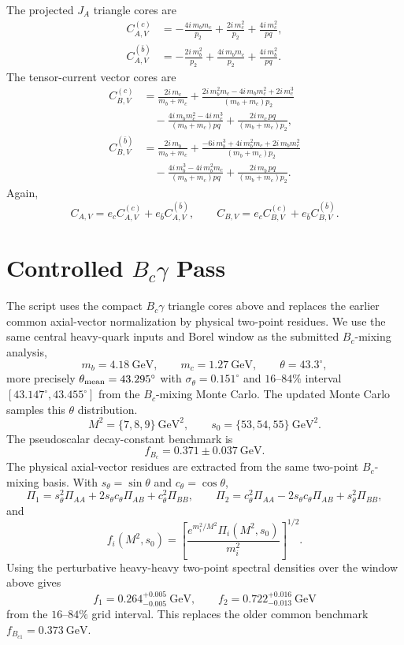 \documentclass[11pt]{article}
\newcommand{\Bc}{B_c}
\newcommand{\BcOne}{B_{c1}}
\newcommand{\GeV}{\mathrm{GeV}}
\begin{document}
The projected \(J_A\) triangle cores are
\[
\begin{aligned}
C_{A,V}^{(c)} &=
-\frac{4i\,m_bm_c}{p_2}
+\frac{2i\,m_c^2}{p_2}
+\frac{4i\,m_c^2}{pq},\\
C_{A,V}^{(\bar b)} &=
-\frac{2i\,m_b^2}{p_2}
+\frac{4i\,m_bm_c}{p_2}
+\frac{4i\,m_b^2}{pq}.
\end{aligned}
\]
The tensor-current vector cores are
\[
\begin{aligned}
C_{B,V}^{(c)} &=
\frac{2i\,m_c}{m_b+m_c}
+\frac{2i\,m_b^2m_c-4i\,m_bm_c^2+2i\,m_c^3}
       {(m_b+m_c)p_2} \\
&\quad
-\frac{4i\,m_bm_c^2-4i\,m_c^3}{(m_b+m_c)pq}
+\frac{2i\,m_c\,pq}{(m_b+m_c)p_2},\\
C_{B,V}^{(\bar b)} &=
\frac{2i\,m_b}{m_b+m_c}
+\frac{-6i\,m_b^3+4i\,m_b^2m_c+2i\,m_bm_c^2}
       {(m_b+m_c)p_2} \\
&\quad
-\frac{4i\,m_b^3-4i\,m_b^2m_c}{(m_b+m_c)pq}
+\frac{2i\,m_b\,pq}{(m_b+m_c)p_2}.
\end{aligned}
\]
Again,
\[
C_{A,V}=e_c C_{A,V}^{(c)}+e_{\bar b}C_{A,V}^{(\bar b)},\qquad
C_{B,V}=e_c C_{B,V}^{(c)}+e_{\bar b}C_{B,V}^{(\bar b)} .
\]

\section{Controlled \texorpdfstring{\(\Bc\gamma\)}{Bc gamma} Pass}

The script
uses the compact \(B_c\gamma\) triangle cores above and replaces the earlier
common axial-vector normalization by physical two-point residues.  We use the
same central heavy-quark inputs and Borel window as the submitted
\(B_c\)-mixing analysis,
\[
m_b=4.18~\GeV,\qquad m_c=1.27~\GeV,\qquad
\theta=43.3^\circ,
\]
more precisely \(\theta_{\rm mean}=43.295^\circ\) with
\(\sigma_\theta=0.151^\circ\) and \(16\)--\(84\%\) interval
\([43.147^\circ,43.455^\circ]\) from the \(B_c\)-mixing Monte Carlo.  The
updated Monte Carlo samples this \(\theta\) distribution.
\[
M^2=\{7,8,9\}~\GeV^2,\qquad s_0=\{53,54,55\}~\GeV^2.
\]
The pseudoscalar decay-constant benchmark is
\[
f_{\Bc}=0.371\pm0.037~\GeV .
\]
The physical axial-vector residues are extracted from the same two-point
\(B_c\)-mixing basis.  With \(s_\theta=\sin\theta\) and
\(c_\theta=\cos\theta\),
\[
\Pi_1=s_\theta^2\Pi_{AA}+2s_\theta c_\theta\Pi_{AB}
      +c_\theta^2\Pi_{BB},\qquad
\Pi_2=c_\theta^2\Pi_{AA}-2s_\theta c_\theta\Pi_{AB}
      +s_\theta^2\Pi_{BB},
\]
and
\[
f_i(M^2,s_0)=
\left[
\frac{e^{m_i^2/M^2}\Pi_i(M^2,s_0)}{m_i^2}
\right]^{1/2}.
\]
Using the perturbative heavy-heavy two-point spectral densities over the
window above gives
\[
f_1=0.264^{+0.005}_{-0.005}~\GeV,\qquad
f_2=0.722^{+0.016}_{-0.013}~\GeV
\]
from the \(16\)--\(84\%\) grid interval.  This replaces the older common
benchmark \(f_{\BcOne}=0.373~\GeV\).
\end{document}
